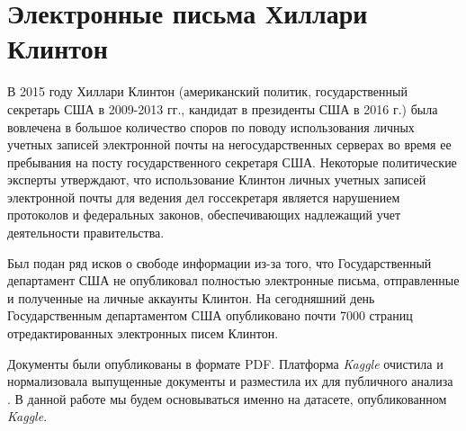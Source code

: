 \chapter{Электронные письма Хиллари Клинтон}

В 2015 году Хиллари Клинтон (американский политик, государственный секретарь США в 2009-2013 гг., кандидат в президенты США в 2016 г.) была вовлечена в большое количество споров по поводу использования личных учетных записей электронной почты на негосударственных серверах во время ее пребывания на посту государственного секретаря США. Некоторые политические эксперты утверждают, что использование Клинтон личных учетных записей электронной почты для ведения дел госсекретаря является нарушением протоколов и федеральных законов, обеспечивающих надлежащий учет деятельности правительства. 

Был подан ряд исков о свободе информации из-за того, что Государственный департамент США не опубликовал полностью электронные письма, отправленные и полученные на личные аккаунты Клинтон. На сегодняшний день Государственным департаментом США опубликовано почти 7000 страниц отредактированных электронных писем Клинтон. 

Документы были опубликованы в формате PDF. Платформа \textit{Kaggle} очистила и нормализовала выпущенные документы и разместила их для публичного анализа \cite{bib1}. В данной работе мы будем основываться именно на датасете, опубликованном \textit{Kaggle}.